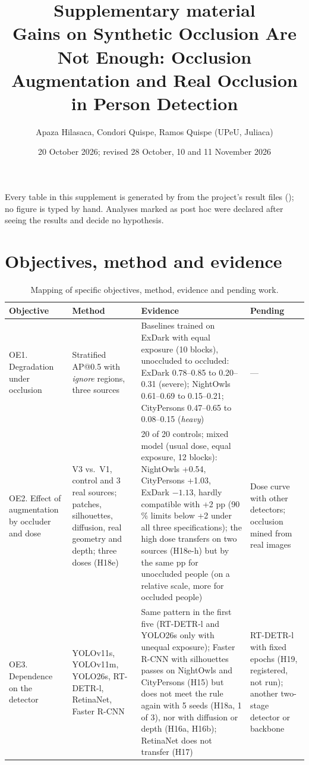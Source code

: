 \documentclass[10pt]{article}
\title{Supplementary material\\[2pt]\large Gains on Synthetic Occlusion Are Not Enough: Occlusion Augmentation and Real Occlusion in Person Detection}
\author{Apaza Hilasaca, Condori Quispe, Ramos Quispe (UPeU, Juliaca)}
\date{20 October 2026; revised 28 October, 10 and 11 November 2026}
\begin{document}
\maketitle
\noindent Every table in this supplement is generated by  from the project's result files (); no figure is typed by hand. Analyses marked as post hoc were declared after seeing the results and decide no hypothesis.

\section{Objectives, method and evidence}
\begin{table}[H]\centering\small
\caption{Mapping of specific objectives, method, evidence and pending work.}
\begin{tabular}{@{}p{3.3cm}p{4.6cm}p{5.4cm}p{2.6cm}@{}}\toprule
\textbf{Objective} & \textbf{Method} & \textbf{Evidence} & \textbf{Pending} \\\midrule
OE1. Degradation under occlusion & Stratified AP@0.5 with \emph{ignore} regions, three sources & Baselines trained on ExDark with equal exposure (10 blocks), unoccluded to occluded: ExDark 0.78--0.85 to 0.20--0.31 (severe); NightOwls 0.61--0.69 to 0.15--0.21; CityPersons 0.47--0.65 to 0.08--0.15 (\emph{heavy}) & --- \\
OE2. Effect of augmentation by occluder and dose & V3 vs.\ V1, control and 3 real sources; patches, silhouettes, diffusion, real geometry and depth; three doses (H18e) & 20 of 20 controls; mixed model (usual dose, equal exposure, 12 blocks): NightOwls +0.54, CityPersons +1.03, ExDark $-1.13$, hardly compatible with +2 pp (90\,\% limits below +2 under all three specifications); the high dose transfers on two sources (H18e-h) but by the same pp for unoccluded people (on a relative scale, more for occluded people) & Dose curve with other detectors; occlusion mined from real images \\
OE3. Dependence on the detector & YOLOv11s, YOLOv11m, YOLO26s, RT-DETR-l, RetinaNet, Faster R-CNN & Same pattern in the first five (RT-DETR-l and YOLO26s only with unequal exposure); Faster R-CNN with silhouettes passes on NightOwls and CityPersons (H15) but does not meet the rule again with 5 seeds (H18a, 1 of 3), nor with diffusion or depth (H16a, H16b); RetinaNet does not transfer (H17) & RT-DETR-l with fixed epochs (H19, registered, not run); another two-stage detector or backbone \\

\end{tabular}
\end{table}
\end{document}

